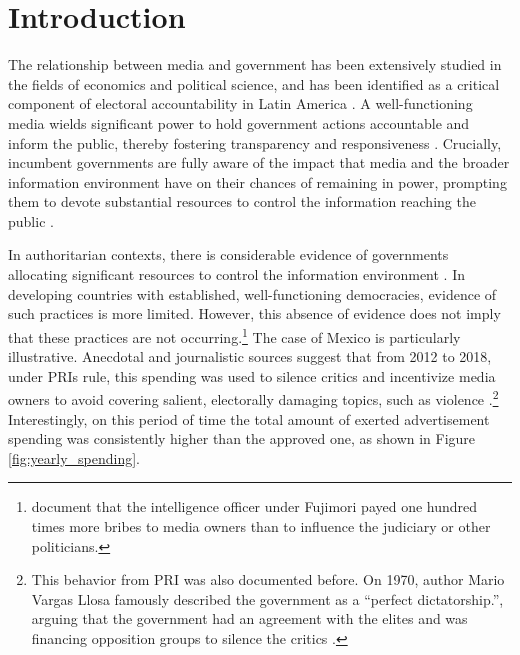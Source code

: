 \documentclass[14]{article}
\begin{document}

\section{Introduction}

The relationship between media and government has been extensively studied in the fields of economics and political science, and has been identified as a critical component of electoral accountability in Latin America \citep{Audits-Ferraz-QJE, PolInfo-Enriquez-JEEA, Marshall}. A well-functioning media wields significant power to hold government actions accountable and inform the public, thereby fostering transparency and responsiveness \citep{Stromberg-MediaCoverage}. Crucially, incumbent governments are fully aware of the impact that media and the broader information environment have on their chances of remaining in power, prompting them to devote substantial resources to control the information reaching the public \citep{Autocracy-Guriev-JPE}.

In authoritarian contexts, there is considerable evidence of governments allocating significant resources to control the information environment \citep{CensorshipChina-King-Science, CensorshipCollective-King-APSR}. In developing countries with established, well-functioning democracies, evidence of such practices is more limited. However, this absence of evidence does not imply that these practices are not occurring.\footnote{\cite{Peru-Macmillan-JEP} document that the intelligence officer under Fujimori payed one hundred times more bribes to media owners than to influence the judiciary or other politicians.} The case of Mexico is particularly illustrative. Anecdotal and journalistic sources suggest that from 2012 to 2018, under PRIs rule, this spending was used to silence critics and incentivize media owners to avoid covering salient, electorally damaging topics, such as violence \citep{Times}.\footnote{This behavior from PRI was also documented before. On 1970, author Mario Vargas Llosa famously described the government as a “perfect dictatorship.”, arguing that the government had an agreement with the elites and was financing opposition groups to silence the critics \citep{DictaduraPerf-Llosa}.} Interestingly, on this period of time the total amount of exerted advertisement spending was consistently higher than the approved one, as shown in Figure \ref{fig:yearly_spending}.
\end{document}
